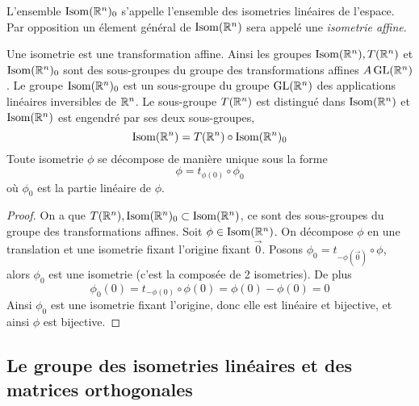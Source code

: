 \begin{definition}
	L'ensemble $\operatorname{Isom}(\mathbb{R}^n)_0$ s'appelle l'ensemble des isometries linéaires de
	l'espace. Par opposition un élement général de $\operatorname{Isom}(\mathbb{R}^n)$ sera appelé une
	\emph{isometrie affine}.
\end{definition}

\begin{theorem}
	Une isometrie est une transformation affine. Ainsi les groupes $\operatorname{Isom}(\mathbb{R}^n),
	T(\mathbb{R}^n)$ et $\operatorname{Isom}(\mathbb{R}^n)_0$ sont des sous-groupes du groupe des
	transformations affines $A\operatorname{GL}(\mathbb{R}^n)$. Le groupe $\operatorname{Isom}(\mathbb{R}^n)_0$ est un
	sous-groupe du groupe $\operatorname{GL}(\mathbb{R}^n)$ des applications linéaires inversibles de
	$\mathbb{R}^n$. Le sous-groupe $T(\mathbb{R}^n)$ est distingué dans $\operatorname{Isom}(\mathbb{R}^n)$ et
	$\operatorname{Isom}(\mathbb{R}^n)$ est engendré par ses deux sous-groupes,
	\begin{equation*}
		\operatorname{Isom}(\mathbb{R}^n) = T(\mathbb{R}^n) \circ \operatorname{Isom}(\mathbb{R}^n)_0
	\end{equation*}
	Toute isometrie $\phi$ se décompose de manière unique sous la forme
	\begin{equation*}
		\phi = t_{\phi(0)} \circ \phi_0
	\end{equation*}
	où $\phi_0$ est la partie linéaire de $\phi$.
\end{theorem}

\begin{proof}
	On a que $T(\mathbb{R}^n), \operatorname{Isom}(\mathbb{R}^n)_0 \subset \operatorname{Isom}(\mathbb{R}^n)$, ce sont des
	sous-groupes du groupe des transformations affines.  Soit
	$\phi\in\operatorname{Isom}(\mathbb{R}^n)$. On décompose $\phi$ en une translation et une isometrie
	fixant l'origine fixant $\vec{0}$.  Posons $\phi_0 = t_{-\phi(\vec{0})} \circ
	\phi$, alors $\phi_0$ est une isometrie (c'est la composée de 2 isometries).
	De plus
	\begin{equation*}
		\phi_0(0) = t_{-\phi(0)} \circ \phi(0) = \phi(0) - \phi(0) = 0
	\end{equation*}
	Ainsi $\phi_0$ est une isometrie fixant l'origine, donc elle est linéaire et
	bijective, et ainsi $\phi$ est bijective.
\end{proof}

\subsection{Le groupe des isometries linéaires et des matrices orthogonales}

